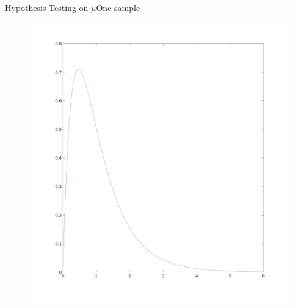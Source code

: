 \documentclass[aspectratio=169,10pt,t]{beamer}
\begin{document}
\begin{frame}{Hypothesis Testing on $\mu$}{One-sample}
	\begin{figure}[H]
		\centering
		\includegraphics[scale=0.15]{images/f.png}
	\end{figure} 
\end{frame}
\end{document}
